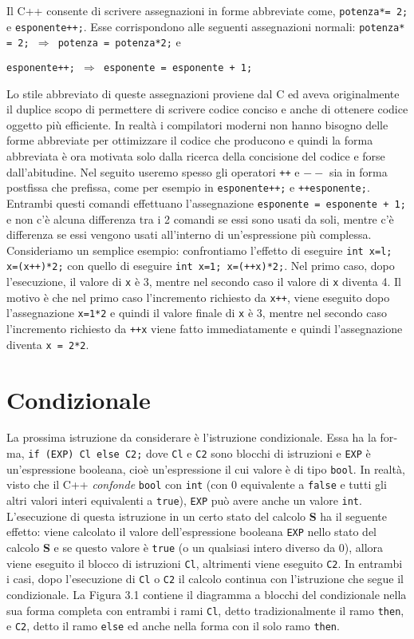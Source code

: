 \documentclass[a4paper,12pt]{book}
\begin{document}
Il C++ consente di scrivere assegnazioni in forme abbreviate come, \texttt{potenza*= 2;} e \texttt{esponente++;}. Esse corrispondono alle seguenti assegnazioni normali: \texttt{potenza* = 2; $\Rightarrow{}$ potenza = potenza*2;} e 

\noindent \texttt{esponente++; $\Rightarrow{}$ esponente = esponente + 1;}

\noindent Lo stile abbreviato di queste assegnazioni proviene dal C ed aveva originalmente il duplice scopo di permettere di scrivere codice conciso e anche di ottenere codice oggetto più efficiente.
In realtà i compilatori moderni non hanno bisogno delle forme abbreviate per ottimizzare il codice che producono e quindi la forma abbreviata è ora motivata solo dalla ricerca della concisione del codice e forse dall'abitudine.
Nel seguito useremo spesso gli operatori \texttt{++} e \texttt{$--$} sia in forma postfissa che prefissa, come per esempio in \texttt{esponente++;} e \texttt{++esponente;}.
Entrambi questi comandi effettuano l'assegnazione \texttt{esponente = esponente + 1;} e non c'è alcuna differenza tra i 2 comandi se essi sono usati da soli, mentre c'è differenza se essi vengono usati all'interno di un'espressione più complessa. Consideriamo un semplice esempio: confrontiamo l'effetto di eseguire \texttt{int x=l; x=(x++)*2;} con quello di eseguire \texttt{int x=1; x=(++x)*2;}.
Nel primo caso, dopo l'esecuzione, il valore di \texttt{x} è 3, mentre nel secondo caso il valore di \texttt{x} diventa 4.
Il motivo è che nel primo caso l'incremento richiesto da \texttt{x++}, viene eseguito dopo l'assegnazione \texttt{x=1*2} e quindi il valore finale di \texttt{x} è 3, mentre nel secondo caso l'incremento richiesto da \texttt{++x} viene fatto immediatamente e quindi l'assegnazione diventa \texttt{x = 2*2}.

\section{Condizionale}
La prossima istruzione da considerare è l'istruzione condizionale.
Essa ha la for­ma, \texttt{if (EXP) Cl else C2;} dove \texttt{Cl} e \texttt{C2} sono blocchi di istruzioni e \texttt{EXP} è un'espressione booleana, cioè un'espressione il cui valore è di tipo \texttt{bool}.
In realtà, visto che il C++ \textit{confonde} \texttt{bool} con \texttt{int} (con 0 equivalente a \texttt{false} e tutti gli altri valori interi equivalenti a \texttt{true}), \texttt{EXP} può avere anche un valore \texttt{int}.
L'esecuzione di questa istruzione in un certo stato del calcolo \textbf{S} ha il seguente effetto: viene calcolato il valore dell'espressione booleana \texttt{EXP} nello stato del calcolo \textbf{S} e se questo valore è \texttt{true} (o un qualsiasi intero diverso da 0), allora viene eseguito il blocco di istruzioni \texttt{Cl}, altrimenti viene eseguito \texttt{C2}.
In entrambi i casi, dopo l'esecuzione di \texttt{Cl} o \texttt{C2} il calcolo continua con l'istruzione che segue il condizionale.
La Figura 3.1 contiene il diagramma a blocchi del condizionale nella sua forma completa con entrambi i rami \texttt{Cl}, detto tradizionalmente il ramo \texttt{then}, e \texttt{C2}, detto il ramo \texttt{else} ed anche nella forma con il solo ramo \texttt{then}. 
\end{document}
